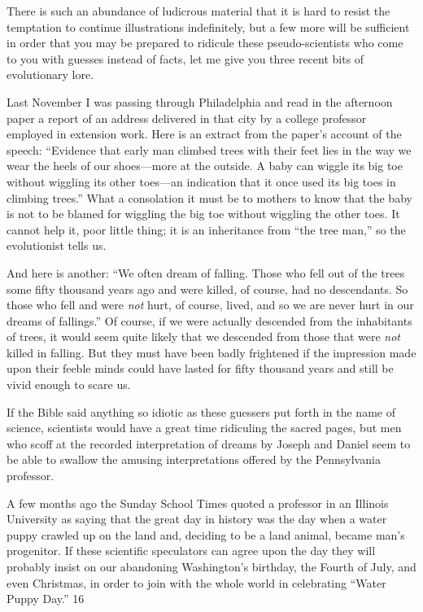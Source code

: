 There is such an abundance of ludicrous material that it is hard to resist the temptation to
continue illustrations indefinitely, but a few more will be sufficient in order that you may be
prepared to ridicule these pseudo-scientists who come to you with guesses instead of facts,
let me give you three recent bits of evolutionary lore.

Last November I was passing through Philadelphia and read in the afternoon paper a report
of an address delivered in that city by a college professor employed in extension work. Here
is an extract from the paper's account of the speech: ``Evidence that early man climbed trees
with their feet lies in the way we wear the heels of our shoes—more at the outside. A baby
can wiggle its big toe without wiggling its other toes—an indication that it once used its big
toes in climbing trees.'' What a consolation it must be to mothers to know that the baby is not
to be blamed for wiggling the big toe without wiggling the other toes. It cannot help it, poor
little thing; it is an inheritance from ``the tree man,'' so the evolutionist tells us.

And here is another: ``We often dream of falling. Those who fell out of the trees some fifty
thousand years ago and were killed, of course, had no descendants. So those who fell and
were \textit{not} hurt, of course, lived, and so we are never hurt in our dreams of fallings.'' Of course,
if we were actually descended from the inhabitants of trees, it would seem quite likely that
we descended from those that were \textit{not} killed in falling. But they must have been badly
frightened if the impression made upon their feeble minds could have lasted for fifty
thousand years and still be vivid enough to scare us.

If the Bible said anything so idiotic as these guessers put forth in the name of science,
scientists would have a great time ridiculing the sacred pages, but men who scoff at the
recorded interpretation of dreams by Joseph and Daniel seem to be able to swallow the
amusing interpretations offered by the Pennsylvania professor.

A few months ago the Sunday School Times quoted a professor in an Illinois University as
saying that the great day in history was the day when a water puppy crawled up on the land
and, deciding to be a land animal, became man's progenitor. If these scientific speculators
can agree upon the day they will probably insist on our abandoning Washington's birthday,
the Fourth of July, and even Christmas, in order to join with the whole world in celebrating
``Water Puppy Day.'' 16

